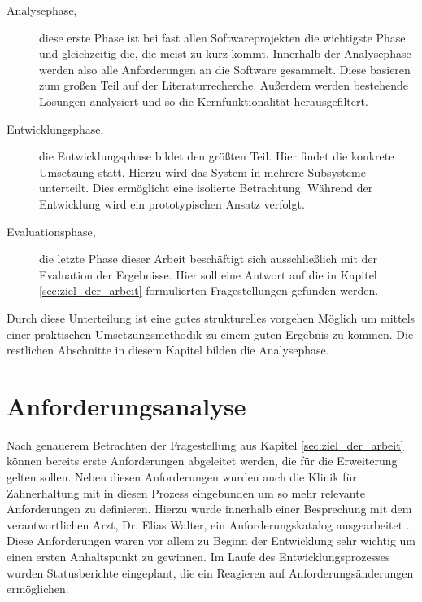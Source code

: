 \begin{description}
	\item[Analysephase,] diese erste Phase ist bei fast allen Softwareprojekten die
		wichtigste Phase und gleichzeitig die, die meist zu kurz kommt. Innerhalb der
		Analysephase werden also alle Anforderungen an die Software gesammelt. Diese
		basieren zum großen Teil auf der Literaturrecherche. Außerdem werden bestehende
		Lösungen analysiert und so die Kernfunktionalität herausgefiltert.

	\item[Entwicklungsphase,] die Entwicklungsphase bildet den größten Teil. Hier
		findet die konkrete Umsetzung statt. Hierzu wird das System in mehrere Subsysteme
		unterteilt. Dies ermöglicht eine isolierte Betrachtung. Während der Entwicklung
		wird ein prototypischen Ansatz verfolgt.

	\item[Evaluationsphase,] die letzte Phase dieser Arbeit beschäftigt sich ausschließlich
		mit der Evaluation der Ergebnisse. Hier soll eine Antwort auf die in Kapitel
		\ref{sec:ziel_der_arbeit} formulierten Fragestellungen gefunden werden.
\end{description}

Durch diese Unterteilung ist eine gutes strukturelles vorgehen Möglich um
mittels einer praktischen Umsetzungsmethodik zu einem guten Ergebnis zu kommen. Die
restlichen Abschnitte in diesem Kapitel bilden die Analysephase.

\section{Anforderungsanalyse}
\label{sec:anforderungsanalyse} Nach genauerem Betrachten der Fragestellung aus Kapitel
\ref{sec:ziel_der_arbeit} können bereits erste Anforderungen abgeleitet werden,
die für die Erweiterung gelten sollen. Neben diesen Anforderungen wurden auch die
Klinik für Zahnerhaltung mit in diesen Prozess eingebunden um so mehr relevante Anforderungen
zu definieren. Hierzu wurde innerhalb einer Besprechung mit dem verantwortlichen
Arzt, Dr. Elias Walter, ein Anforderungskatalog ausgearbeitet \citep[vgl.][]{walter2025}.
Diese Anforderungen waren vor allem zu Beginn der Entwicklung sehr wichtig um einen
ersten Anhaltspunkt zu gewinnen. Im Laufe des Entwicklungsprozesses wurden
Statusberichte eingeplant, die ein Reagieren auf Anforderungsänderungen ermöglichen.

